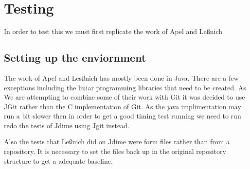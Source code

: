
\chapter{Testing}
In order to test this we must first replicate the work of Apel and Le{\ss}nich

\section{Setting up the enviornment}
The work of Apel and Les{\ss}nich has mostly been done in Java.  There are a few exceptions including the liniar programming libraries that need to be created.  As We are attempting to combine some of their work with Git it was decided to use JGit rather than the C implementation of Git. As the java implimentation may run a bit slower then in order to get a good timing test running we need to run redo the tests of Jdime using Jgit instead. 

Also the tests that Le{\ss}nich did on Jdime were form files rather than from a repository. It is necessary to set the files back up in the original repository structure to get a adequate baseline.
